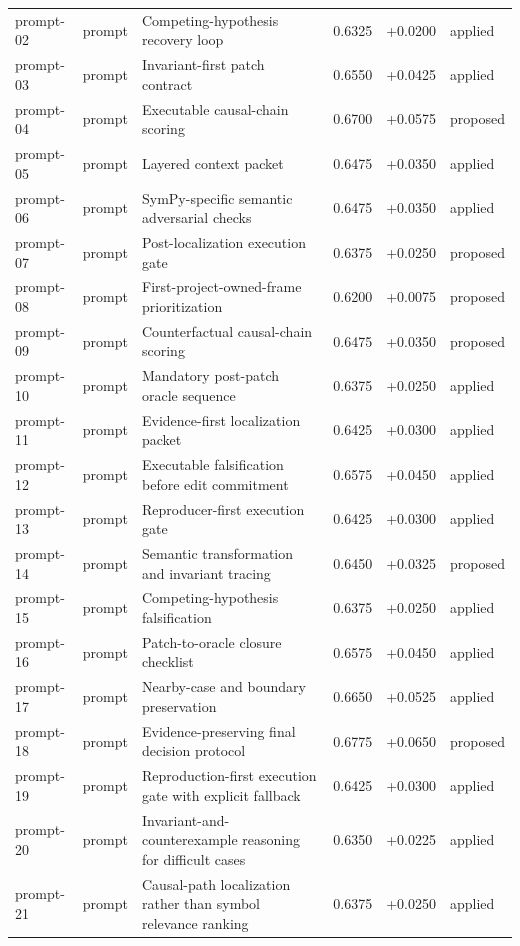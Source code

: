 \begin{center}
\begin{longtable}{llp{5.2cm}rrl}
prompt-02 & prompt & Competing-hypothesis recovery loop & 0.6325 & +0.0200 & applied \\
prompt-03 & prompt & Invariant-first patch contract & 0.6550 & +0.0425 & applied \\
prompt-04 & prompt & Executable causal-chain scoring & 0.6700 & +0.0575 & proposed \\
prompt-05 & prompt & Layered context packet & 0.6475 & +0.0350 & applied \\
prompt-06 & prompt & SymPy-specific semantic adversarial checks & 0.6475 & +0.0350 & applied \\
prompt-07 & prompt & Post-localization execution gate & 0.6375 & +0.0250 & proposed \\
prompt-08 & prompt & First-project-owned-frame prioritization & 0.6200 & +0.0075 & proposed \\
prompt-09 & prompt & Counterfactual causal-chain scoring & 0.6475 & +0.0350 & proposed \\
prompt-10 & prompt & Mandatory post-patch oracle sequence & 0.6375 & +0.0250 & applied \\
prompt-11 & prompt & Evidence-first localization packet & 0.6425 & +0.0300 & applied \\
prompt-12 & prompt & Executable falsification before edit commitment & 0.6575 & +0.0450 & applied \\
prompt-13 & prompt & Reproducer-first execution gate & 0.6425 & +0.0300 & applied \\
prompt-14 & prompt & Semantic transformation and invariant tracing & 0.6450 & +0.0325 & proposed \\
prompt-15 & prompt & Competing-hypothesis falsification & 0.6375 & +0.0250 & applied \\
prompt-16 & prompt & Patch-to-oracle closure checklist & 0.6575 & +0.0450 & applied \\
prompt-17 & prompt & Nearby-case and boundary preservation & 0.6650 & +0.0525 & applied \\
prompt-18 & prompt & Evidence-preserving final decision protocol & 0.6775 & +0.0650 & proposed \\
prompt-19 & prompt & Reproduction-first execution gate with explicit fallback & 0.6425 & +0.0300 & applied \\
prompt-20 & prompt & Invariant-and-counterexample reasoning for difficult cases & 0.6350 & +0.0225 & applied \\
prompt-21 & prompt & Causal-path localization rather than symbol relevance ranking & 0.6375 & +0.0250 & applied \\

\end{longtable}
\end{center}
